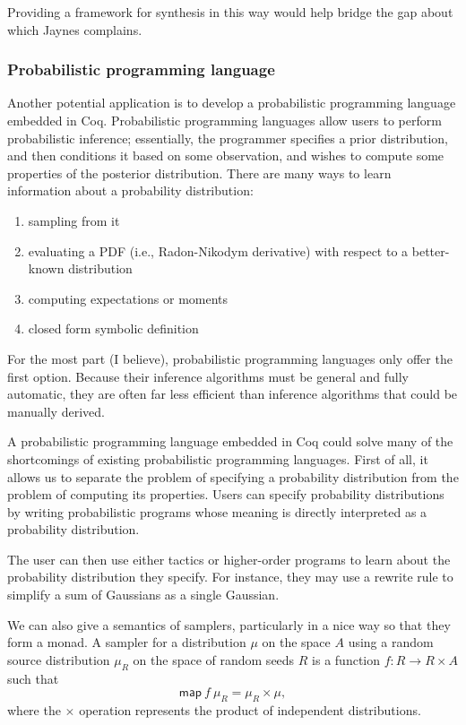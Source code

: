 \documentclass{article}           %
\begin{document}
Providing a framework for synthesis in this way would help bridge the gap about which Jaynes complains.

\subsubsection{Probabilistic programming language}

Another potential application is to develop a probabilistic programming language embedded in Coq. Probabilistic programming languages allow users to perform probabilistic inference; essentially, the programmer specifies a prior distribution, and then conditions it based on some observation, and wishes to compute some properties of the posterior distribution. There are many ways to learn information about a probability distribution:

\begin{enumerate}
\item sampling from it
\item evaluating a PDF (i.e., Radon-Nikodym derivative) with respect to a better-known distribution
\item computing expectations or moments
\item closed form symbolic definition
\end{enumerate}

For the most part (I believe), probabilistic programming languages only offer the first option. Because their inference algorithms must be general and fully automatic, they are often far less efficient than inference algorithms that could be manually derived.

A probabilistic programming language embedded in Coq could solve many of the shortcomings of existing probabilistic programming languages. First of all, it allows us to separate the problem of specifying a probability distribution from the problem of computing its properties. Users can specify probability distributions by writing probabilistic programs whose meaning is directly interpreted as a probability distribution.

The user can then use either tactics or higher-order programs to learn about the probability distribution they specify. For instance, they may use a rewrite rule to simplify a sum of Gaussians as a single Gaussian.

We can also give a semantics of samplers, particularly in a nice way so that they form a monad. A sampler for a distribution $\mu$ on the space $A$ using a random source distribution $\mu_R$ on the space of random seeds $R$ is a function $ f : R \to R \times A$ such that
\[
  \mathsf{map}\ f \ \mu_R = \mu_R \times \mu,
\]
where the $\times$ operation represents the product of independent distributions.
\end{document}
